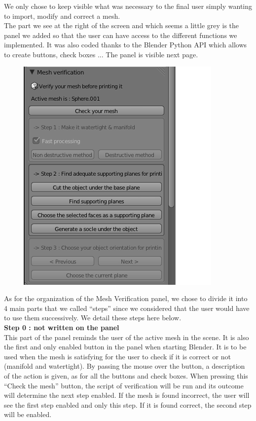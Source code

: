 \documentclass{report}
\begin{document}
\bigskip
\bigskip

We only chose to keep visible what was necessary to the final user simply wanting to import, modify and correct a mesh.\\

The part we see at the right of the screen and which seems a little grey is the panel we added so that the user can have access to the different functions we implemented. It was also coded thanks to the Blender Python API which allows to create buttons, check boxes ... The panel is visible next page.

\newpage

\bigskip
\begin{figure}[!h]
\begin{center}
	\includegraphics[scale=1]{Panel}
\end{center}
\end{figure}
\bigskip

As for the organization of the Mesh Verification panel, we chose to divide it into 4 main parts that we called ``steps'' since we considered that the user would have to use them successively. We detail these steps here below.\\

\textbf{Step 0 : not written on the panel} \\

This part of the panel reminds the user of the active mesh in the scene. It is also the first and only enabled button in the panel when starting Blender. It is to be used when the mesh is satisfying for the user to check if it is correct or not (manifold and watertight). By passing the mouse over the button, a description of the action is given, as for all the buttons and check boxes. When pressing this ``Check the mesh'' button, the script of verification will be run and its outcome will determine the next step enabled. If the mesh is found incorrect, the user will see the first step enabled and only this step. If it is found correct, the second step will be enabled.\\
\end{document}

